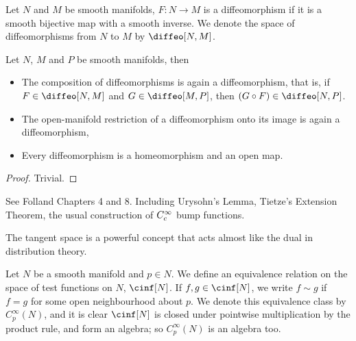 \documentclass[../main-v2-manifolds.tex]{subfiles}
\begin{document}
\begin{definition}\label{lee-chp2:diffeomorphism-definition}
    Let $N$ and $M$ be smooth manifolds, $F:N\to M$ is a diffeomorphism if it is a smooth bijective map with a smooth inverse. We denote the space of diffeomorphisms from $N$ to $M$ by $\diffeo[N,M]$.
\end{definition}

\begin{wts}\label{lee-chp2-diffeomorphism-properties}
    Let $N$, $M$ and $P$ be smooth manifolds, then
    \begin{itemize}
        \item The composition of diffeomorphisms is again a diffeomorphism, that is, if $F\in \diffeo[N,M]$ and $G\in \diffeo[M,P]$, then $(G\circ F)\in \diffeo[N,P]$.
        \item The open-manifold restriction of a diffeomorphism onto its image is again a diffeomorphism,
        \item Every diffeomorphism is a homeomorphism and an open map.
    \end{itemize}
\end{wts}
\begin{proof}
    Trivial.
\end{proof}

See Folland Chapters 4 and 8. Including Urysohn's Lemma, Tietze's Extension Theorem, the usual construction of $C_c^\infty$ bump functions.
\newpage

\newpage
{}
The tangent space is a powerful concept that acts almost like the dual in distribution theory.
\begin{definition}\label{lee-chp3:algebra-of-germs-at-p}
    Let $N$ be a smooth manifold and $p\in N$. We define an equivalence relation on the space of test functions on $N$, $\cinf[N]$. If $f,g\in\cinf[N]$, we write $f\sim g$ if $f=g$ for some open neighbourhood about $p$. We denote this equivalence class by $C_p^\infty(N)$, and it is clear $\cinf[N]$ is closed under pointwise multiplication by the product rule, and form an algebra; so $C_p^\infty(N)$ is an algebra too.
\end{definition}
\end{document}
